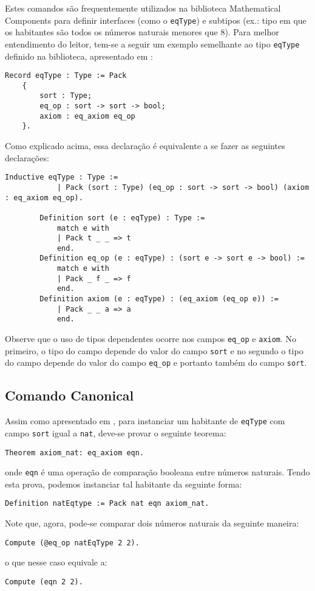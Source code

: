 Estes comandos são frequentemente utilizados na biblioteca Mathematical Components para definir interfaces (como o \lstinline[language = coq]$eqType$) e subtipos (ex.: tipo em que os habitantes são todos os números naturais menores que $8$). Para melhor entendimento do leitor, tem-se a seguir um exemplo semelhante ao tipo \lstinline[language = coq]$eqType$ definido na biblioteca, apresentado em \cite{assia_mahboubi_2022_7118596}:
\begin{lstlisting}[language = coq]
    Record eqType : Type := Pack
    {
        sort : Type;
        eq_op : sort -> sort -> bool;
        axiom : eq_axiom eq_op
    }.
\end{lstlisting}
Como explicado acima, essa declaração é equivalente a se fazer as seguintes declarações:
\begin{lstlisting}[language = coq]
        Inductive eqType : Type :=
            | Pack (sort : Type) (eq_op : sort -> sort -> bool) (axiom : eq_axiom eq_op).
            
        Definition sort (e : eqType) : Type :=
            match e with
            | Pack t _ _ => t
            end.
        Definition eq_op (e : eqType) : (sort e -> sort e -> bool) :=
            match e with
            | Pack _ f _ => f
            end.
        Definition axiom (e : eqType) : (eq_axiom (eq_op e)) :=
            | Pack _ _ a => a
            end.
\end{lstlisting}
Observe que o uso de tipos dependentes ocorre nos campos \lstinline[language = coq]{eq_op} e \lstinline[language = coq]{axiom}. No primeiro, o tipo do campo depende do valor do campo \lstinline[language = coq]{sort} e no segundo o tipo do campo depende do valor do campo \lstinline[language = coq]{eq_op} e portanto também do campo \lstinline[language = coq]{sort}.

\subsection{Comando Canonical} Assim como apresentado em \cite{assia_mahboubi_2022_7118596}, para instanciar um habitante de \lstinline[language = coq]$eqType$ com campo \lstinline[language = coq]$sort$ igual a \lstinline[language = coq]$nat$, deve-se provar o seguinte teorema:
\begin{lstlisting}[language = coq]
    Theorem axiom_nat: eq_axiom eqn.
\end{lstlisting}
onde \lstinline[language = coq]$eqn$ é uma operação de comparação booleana entre números naturais.
Tendo esta prova, podemos instanciar tal habitante
da seguinte forma:
\begin{lstlisting}[language = coq]
    Definition natEqtype := Pack nat eqn axiom_nat.
\end{lstlisting}
Note que, agora, pode-se comparar dois números naturais da seguinte maneira:
\begin{lstlisting}[language = coq]
    Compute (@eq_op natEqType 2 2).
\end{lstlisting}
o que nesse caso equivale a:
\begin{lstlisting}[language = coq]
    Compute (eqn 2 2).
\end{lstlisting}

